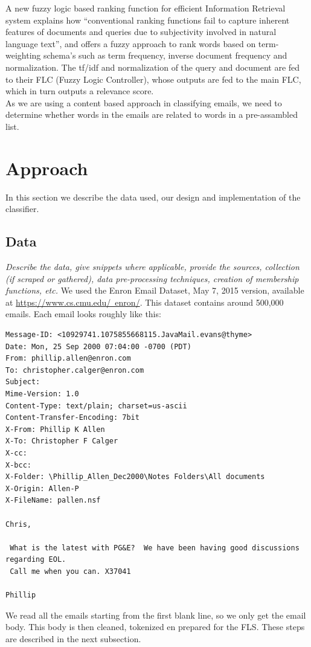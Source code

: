 \documentclass[journal]{IEEEtran}
\begin{document}
A new fuzzy logic based ranking function for efficient Information Retrieval system \cite{ranking} explains how ``conventional ranking functions
fail to capture inherent features of documents and queries due to subjectivity
involved in natural language text'', and offers a fuzzy approach to rank words
based on term-weighting schema's such as term frequency, inverse document
frequency and normalization. The tf/idf and normalization of the query and document are fed to their FLC (Fuzzy Logic Controller), whose outputs are fed to the main FLC, which in turn outputs a relevance score. \\

As we are using a content based approach in classifying emails, we need to determine whether words in the emails are related to words in a pre-assambled list.

\section{Approach}
In this section we describe the data used, our design and implementation of the classifier.

\subsection{Data}
\textit{Describe the data, give snippets where applicable, provide the
sources, collection (if scraped or gathered), data pre-processing techniques,
creation of membership functions, etc.}
We used the Enron Email Dataset, May 7, 2015 version, available at \href{https://www.cs.cmu.edu/~enron/}{https://www.cs.cmu.edu/~enron/}. This dataset contains around 500,000 emails. Each email looks roughly like this:
\begin{lstlisting}
Message-ID: <10929741.1075855668115.JavaMail.evans@thyme>
Date: Mon, 25 Sep 2000 07:04:00 -0700 (PDT)
From: phillip.allen@enron.com
To: christopher.calger@enron.com
Subject: 
Mime-Version: 1.0
Content-Type: text/plain; charset=us-ascii
Content-Transfer-Encoding: 7bit
X-From: Phillip K Allen
X-To: Christopher F Calger
X-cc: 
X-bcc: 
X-Folder: \Phillip_Allen_Dec2000\Notes Folders\All documents
X-Origin: Allen-P
X-FileName: pallen.nsf

Chris,

 What is the latest with PG&E?  We have been having good discussions 
regarding EOL.
 Call me when you can. X37041

Phillip
\end{lstlisting}
We read all the emails starting from the first blank line, so we only get the email body. This body is then cleaned, tokenized en prepared for the FLS. These steps are described in the next subsection.
\end{document}
